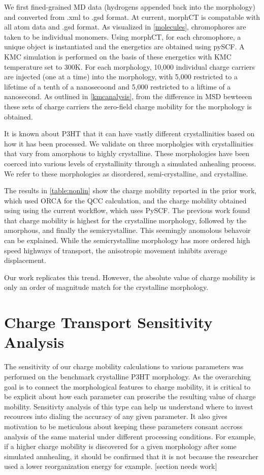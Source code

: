 We first fined-grained MD data (hydrogens appended back into
the morphology) and converted from .xml to .gsd format. At current, morphCT is compatable with all atom data
and .gsd format. As visualized in \autoref{molecules}, chromophores are taken to be individual monomers. 
Using morphCT, for each chromophore, a unique object is instantiated and the energetics are obtained using
pySCF. A KMC simulation is performed on the basis of these energetics with KMC temperature set to 300K. For
each morphology, 10,000 individual charge carriers are injected (one at a time) into the morphology, with
5,000 restricted to a lifetime of a tenth of a nanosecoond and 5,000 restricted to a liftime of a nanosecond.
As outlined in \autoref{kmcanalysis}, from the difference in MSD bewteeen these sets of charge carriers the
zero-field charge mobility for the morphology is obtained. 

It is known about P3HT that it can have vastly different crystallinities based on how it has been processed. 
We validate on three morpholgies with crystallinities that vary from amorphous to highly crystalline. These morphologies have been coerced into various levels of crystallinity through a simulated anhealing process. 
We refer to these morphologies as disordered, semi-crystalline, and crystalline.

The results in \ref{table:nonlin} show the charge mobility reported in the prior work, which used ORCA for
the QCC calculation, and the charge mobility obtained using using the current workflow, which uses PySCF. 
The previous work found that charge mobility is highest for the crystalline morphology, followed by the
amorphous, and finally the semicrystalline. This seemingly anomolous behavoir can be explained. While the
semicrystalline morphology has more ordered high speed highways of transport, the anisotropic movement
inhibits average displacement. 

Our work replicates this trend. However, the absolute value of charge mobility is only an order of magnitude
match for the crystalline morphology. 

\section{Charge Transport Sensitivity Analysis}

\label{Sensitivity}

The sensitivity of our charge mobility calculations to various parameters was performed on the benchmark 
crystalline P3HT morphology. As the overarching goal is to connect the morphological features to charge
mobility, it is critical to be explicit about how each parameter can proscribe the resulting value of charge
mobility. Sensitivty analysis of this type can help us understand where to invest recources into dialing
the accuracy of any given parameter. It also gives motivation to be meticulous about keeping these parameters
consant accross analysis of the same material under different processing conditions. For example, if a higher
charge mobility is discovered for a given morphology after some simulated annhealing,
it should be confirmed that it is not because the researcher used a lower reorganization energy for example. 
[section needs work]



